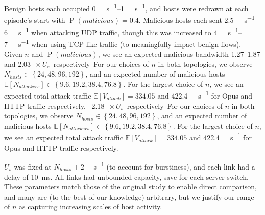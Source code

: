 \documentclass[10pt, times, comsoc]{IEEEtran}
\begin{document}
Benign hosts each occupied \SIrange{0}{1}{\mega\bit\per\second}, and hosts were redrawn at each episode's start with $\operatorname{P}(\mathit{malicious})=0.4$.
Malicious hosts each sent \SIrange{2.5}{6}{\mega\bit\per\second} when attacking UDP traffic, though this was increased to \SIrange{4}{7}{\mega\bit\per\second} when using TCP-like traffic (to meaningfully impact benign flows).
Given $n$ and $\operatorname{P}(\mathit{malicious})$, we see an expected malicious bandwidth \numrange{1.27}{1.87} and \SIrange{2.03}{2.18}{$\! \times U_s$} respectively.
{\color{revisiontext}\cbstart For our choices of $n$ in both topologies, we observe $N_{\mathit{hosts}} \in \left\{24, 48, 96, 192\right\}$, and an expected number of malicious hosts $\mathbb{E}\left[N_{\mathit{attackers}}\right] \in \left\{9.6, 19.2, 38.4, 76.8\right\}$.
For the largest choice of $n$, we see an expected total attack traffic $\mathbb{E}\left[V_{\mathit{attack}}\right] = 334.05$ and \SI{422.4}{\mega\bit\per\second} for Opus and HTTP traffic respectively.
\cbend}

$U_s$ was fixed at $N_{\mathit{hosts}}+2$ \si{\mega\bit\per\second} (to account for burstiness), and each link had a delay of \SI{10}{\milli\second}.
All links had unbounded capacity, save for each server-switch.
These parameters match those of the original study to enable direct comparison, and many are (to the best of our knowledge) arbitrary, but we justify our range of $n$ as capturing increasing scales of host activity.
\end{document}
